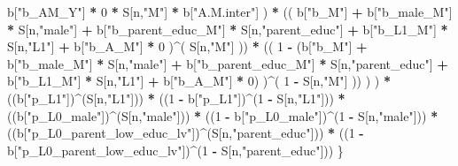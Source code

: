 \documentclass[
]{book}
\newenvironment{Shaded}{\begin{snugshade}}{\end{snugshade}}
\newcommand{\DecValTok}[1]{\textcolor[rgb]{0.00,0.00,0.81}{#1}}
\newcommand{\NormalTok}[1]{#1}
\newcommand{\SpecialCharTok}[1]{\textcolor[rgb]{0.81,0.36,0.00}{\textbf{#1}}}
\newcommand{\StringTok}[1]{\textcolor[rgb]{0.31,0.60,0.02}{#1}}
\begin{document}
\begin{Shaded}
\begin{Highlighting}[]
\NormalTok{                          b[}\StringTok{"b\_AM\_Y"}\NormalTok{] }\SpecialCharTok{*} \DecValTok{0} \SpecialCharTok{*}\NormalTok{ S[n,}\StringTok{"M"}\NormalTok{] }\SpecialCharTok{*}\NormalTok{ b[}\StringTok{"A.M.inter"}\NormalTok{] ) }\SpecialCharTok{*}
\NormalTok{                        (( b[}\StringTok{"b\_M"}\NormalTok{] }\SpecialCharTok{+} 
\NormalTok{                             b[}\StringTok{"b\_male\_M"}\NormalTok{] }\SpecialCharTok{*}\NormalTok{ S[n,}\StringTok{"male"}\NormalTok{] }\SpecialCharTok{+} 
\NormalTok{                             b[}\StringTok{"b\_parent\_educ\_M"}\NormalTok{] }\SpecialCharTok{*}\NormalTok{ S[n,}\StringTok{"parent\_educ"}\NormalTok{] }\SpecialCharTok{+} 
\NormalTok{                             b[}\StringTok{"b\_L1\_M"}\NormalTok{] }\SpecialCharTok{*}\NormalTok{ S[n,}\StringTok{"L1"}\NormalTok{] }\SpecialCharTok{+}
\NormalTok{                             b[}\StringTok{"b\_A\_M"}\NormalTok{] }\SpecialCharTok{*} \DecValTok{0}\NormalTok{ )}\SpecialCharTok{\^{}}\NormalTok{( S[n,}\StringTok{"M"}\NormalTok{] )) }\SpecialCharTok{*}
\NormalTok{                        (( }\DecValTok{1} \SpecialCharTok{{-}}\NormalTok{ (b[}\StringTok{"b\_M"}\NormalTok{] }\SpecialCharTok{+} 
\NormalTok{                                  b[}\StringTok{"b\_male\_M"}\NormalTok{] }\SpecialCharTok{*}\NormalTok{ S[n,}\StringTok{"male"}\NormalTok{] }\SpecialCharTok{+} 
\NormalTok{                                  b[}\StringTok{"b\_parent\_educ\_M"}\NormalTok{] }\SpecialCharTok{*}\NormalTok{ S[n,}\StringTok{"parent\_educ"}\NormalTok{] }\SpecialCharTok{+} 
\NormalTok{                                  b[}\StringTok{"b\_L1\_M"}\NormalTok{] }\SpecialCharTok{*}\NormalTok{ S[n,}\StringTok{"L1"}\NormalTok{] }\SpecialCharTok{+}
\NormalTok{                                  b[}\StringTok{"b\_A\_M"}\NormalTok{] }\SpecialCharTok{*} \DecValTok{0}\NormalTok{) )}\SpecialCharTok{\^{}}\NormalTok{( }\DecValTok{1} \SpecialCharTok{{-}}\NormalTok{ S[n,}\StringTok{"M"}\NormalTok{] )) ) ) }\SpecialCharTok{*}
\NormalTok{    ((b[}\StringTok{"p\_L1"}\NormalTok{])}\SpecialCharTok{\^{}}\NormalTok{(S[n,}\StringTok{"L1"}\NormalTok{])) }\SpecialCharTok{*}
\NormalTok{    ((}\DecValTok{1} \SpecialCharTok{{-}}\NormalTok{ b[}\StringTok{"p\_L1"}\NormalTok{])}\SpecialCharTok{\^{}}\NormalTok{(}\DecValTok{1} \SpecialCharTok{{-}}\NormalTok{ S[n,}\StringTok{"L1"}\NormalTok{])) }\SpecialCharTok{*}
\NormalTok{    ((b[}\StringTok{"p\_L0\_male"}\NormalTok{])}\SpecialCharTok{\^{}}\NormalTok{(S[n,}\StringTok{"male"}\NormalTok{])) }\SpecialCharTok{*} 
\NormalTok{    ((}\DecValTok{1} \SpecialCharTok{{-}}\NormalTok{ b[}\StringTok{"p\_L0\_male"}\NormalTok{])}\SpecialCharTok{\^{}}\NormalTok{(}\DecValTok{1} \SpecialCharTok{{-}}\NormalTok{ S[n,}\StringTok{"male"}\NormalTok{])) }\SpecialCharTok{*} 
\NormalTok{    ((b[}\StringTok{"p\_L0\_parent\_low\_educ\_lv"}\NormalTok{])}\SpecialCharTok{\^{}}\NormalTok{(S[n,}\StringTok{"parent\_educ"}\NormalTok{])) }\SpecialCharTok{*}
\NormalTok{    ((}\DecValTok{1} \SpecialCharTok{{-}}\NormalTok{ b[}\StringTok{"p\_L0\_parent\_low\_educ\_lv"}\NormalTok{])}\SpecialCharTok{\^{}}\NormalTok{(}\DecValTok{1} \SpecialCharTok{{-}}\NormalTok{ S[n,}\StringTok{"parent\_educ"}\NormalTok{])) }
\NormalTok{\}}


\end{Highlighting}
\end{Shaded}
\end{document}
